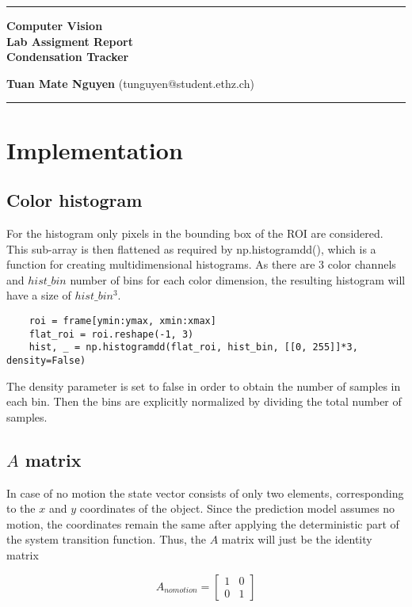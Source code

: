 \documentclass[10pt,a4paper,twoside]{article}
\begin{document}
\begin{center}
\hrule

\vspace{.4cm}
{\bf {\Huge Computer Vision} \\ {\huge Lab Assigment Report} \\ {\Large Condensation Tracker}}
\vspace{.2cm}
\end{center}
{\bf Tuan Mate Nguyen}  (tunguyen@student.ethz.ch)
\hrule


\section{Implementation}
\subsection{Color histogram}
For the histogram only pixels in the bounding box of the ROI are considered. This sub-array is then flattened as
required by np.histogramdd(), which is a function for creating multidimensional
histograms. As there are 3 color channels and $hist\_bin$ number of bins for each
color dimension, the resulting histogram will have a size of $hist\_bin^3$.

\begin{verbatim}
    roi = frame[ymin:ymax, xmin:xmax]
    flat_roi = roi.reshape(-1, 3)
    hist, _ = np.histogramdd(flat_roi, hist_bin, [[0, 255]]*3, density=False)
\end{verbatim}

The density parameter is set to false in order to obtain the number of samples in
each bin. Then the bins are explicitly normalized by dividing the total number of
samples.

\subsection{$A$ matrix}
In case of no motion the state vector consists of only two elements,
corresponding to the $x$ and $y$ coordinates of the object. Since the prediction
model assumes no motion, the coordinates remain the same after applying the
deterministic part of the system transition function. Thus, the $A$ matrix will
just be the identity matrix

\[ A_{no motion} =
\begin{bmatrix}
    1 & 0 \\
    0 & 1 
\end{bmatrix}
\]
\end{document}
